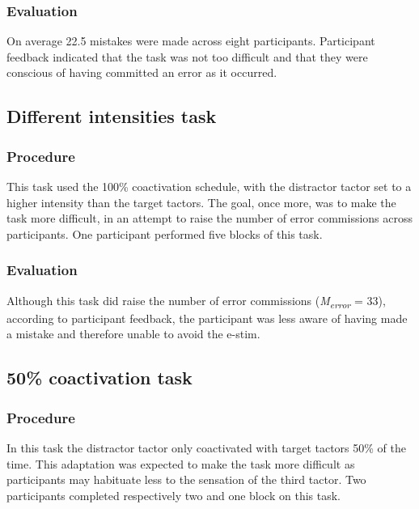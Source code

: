 \documentclass[twocolumn, serif, authordate, empirical]{jote-article}
\begin{document}
 {} \subsubsection*{Evaluation} On average 22.5 mistakes were made across eight participants. Participant feedback indicated that the task was not too difficult and that they were conscious of having committed an error as it occurred.

 {}\subsection*{Different intensities task} 

 {} \subsubsection*{Procedure} This task used the 100\% coactivation schedule, with the distractor tactor set to a higher intensity than the target tactors. The goal, once more, was to make the task more difficult, in an attempt to raise the number of error commissions across participants. One participant performed five blocks of this task.

 {} \subsubsection*{Evaluation} Although this task did raise the number of error commissions (\emph{M}\textsubscript{\emph{error}} = 33), according to participant feedback, the participant was less aware of having made a mistake and therefore unable to avoid the e-stim.~

 {} \subsection*{50\% coactivation task}

 {} \subsubsection*{Procedure} In this task the distractor tactor only coactivated with target tactors 50\% of the time. This adaptation was expected to make the task more difficult as participants may habituate less to the sensation of the third tactor. Two participants completed respectively two and one block on this task.
\end{document}
